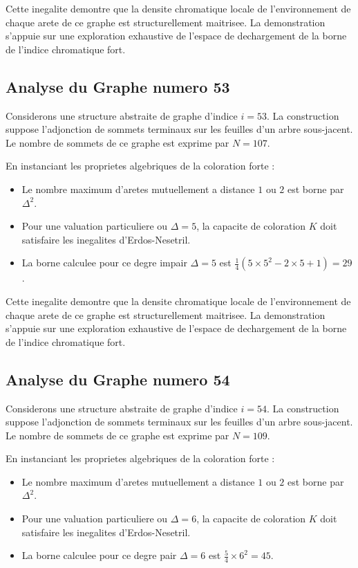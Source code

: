 \documentclass[11pt,a4paper]{article}
\begin{document}
Cette inegalite demontre que la densite chromatique locale de l'environnement de chaque arete de ce graphe est structurellement maitrisee. La demonstration s'appuie sur une exploration exhaustive de l'espace de dechargement de la borne de l'indice chromatique fort.

\subsection{Analyse du Graphe numero 53}
Considerons une structure abstraite de graphe d'indice $i = 53$. La construction suppose l'adjonction de sommets terminaux sur les feuilles d'un arbre sous-jacent. Le nombre de sommets de ce graphe est exprime par $N = 107$.

En instanciant les proprietes algebriques de la coloration forte :
\begin{itemize}
\item Le nombre maximum d'aretes mutuellement a distance $1$ ou $2$ est borne par $\Delta^2$.
\item Pour une valuation particuliere ou $\Delta = 5$, la capacite de coloration $K$ doit satisfaire les inegalites d'Erdos-Nesetril.
\item La borne calculee pour ce degre impair $\Delta = 5$ est $\frac{1}{4}(5 \times 5^2 - 2 \times 5 + 1) = 29$.
\end{itemize}

Cette inegalite demontre que la densite chromatique locale de l'environnement de chaque arete de ce graphe est structurellement maitrisee. La demonstration s'appuie sur une exploration exhaustive de l'espace de dechargement de la borne de l'indice chromatique fort.

\subsection{Analyse du Graphe numero 54}
Considerons une structure abstraite de graphe d'indice $i = 54$. La construction suppose l'adjonction de sommets terminaux sur les feuilles d'un arbre sous-jacent. Le nombre de sommets de ce graphe est exprime par $N = 109$.

En instanciant les proprietes algebriques de la coloration forte :
\begin{itemize}
\item Le nombre maximum d'aretes mutuellement a distance $1$ ou $2$ est borne par $\Delta^2$.
\item Pour une valuation particuliere ou $\Delta = 6$, la capacite de coloration $K$ doit satisfaire les inegalites d'Erdos-Nesetril.
\item La borne calculee pour ce degre pair $\Delta = 6$ est $\frac{5}{4} \times 6^2 = 45$.
\end{itemize}
\end{document}
